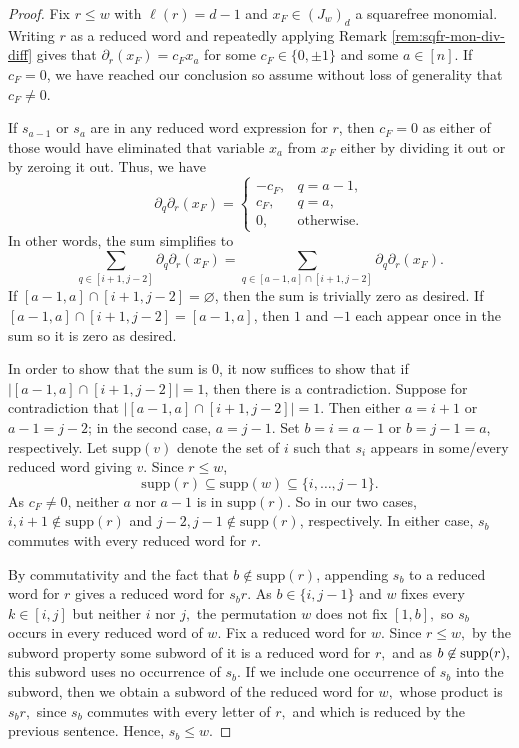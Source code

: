 \begin{proof}
    
    Fix $r\leq w$ with $\ell(r) = d-1$ and $x_F \in (J_w)_d$ a squarefree monomial.
    Writing $r$ as a reduced word and repeatedly applying Remark \ref{rem:sqfr-mon-div-diff} gives that $\partial_r(x_F) = c_F x_a$ for some $c_F\in \{0,\pm 1\}$ and some $a\in [n]$.
    If $c_F = 0$, we have reached our conclusion so assume without loss of generality that $c_F \neq 0$.

    If $s_{a-1}$ or $s_{a}$ are in any reduced word expression for $r$, then  $c_F = 0$ as either of those would have eliminated that variable $x_a$ from $x_{F}$ either by dividing it out or by zeroing it out.
    Thus, we have 
    \begin{equation}
    \label{eq:two-terms}
     \partial_q\partial_r(x_F)  =
     \begin{cases}
     -c_F,&q=a-1,\\
     c_F,&q=a,\\
     0,&\text{otherwise}.
     \end{cases}
     \end{equation}
In other words, the sum simplifies to 
\[\displaystyle\sum_{q\in [i+1,j-2]}\partial_q\partial_r(x_F)=\displaystyle\sum_{q\in [a-1,a]\cap [i+1,j-2]}\partial_q\partial_r(x_F).\]
If $[a-1,a]\cap [i+1,j-2] = \varnothing$, then the sum is trivially zero as desired.
If $[a-1,a]\cap [i+1,j-2] = [a-1,a]$, then $1$ and $-1$ each appear once in the sum so it is zero as desired.

In order to show that the sum is $0$, it now suffices to show that if $|[a-1,a]\cap [i+1,j-2]| = 1$, then there is a contradiction.
Suppose for contradiction that $|[a-1,a]\cap [i+1,j-2]| = 1$.
Then either $a=i+1$ or $a-1 = j-2$; in the second case, $a=j-1$.
Set $b = i = a-1$ or $b =j-1=a$, respectively.
Let $ \mathrm{supp}(v)$ denote the set of $i$ such that $s_i$ appears in some/every reduced word giving $v$.
Since \(r\leq w\),
\[\mathrm{supp}(r)\subseteq \mathrm{supp}(w)\subseteq\{i,\ldots,j-1\}. \]
As $c_F\neq 0$, neither $a$ nor $a-1$ is in $\mathrm{supp}(r)$.
So in our two cases, $i,i+1\not\in \mathrm{supp}(r)$ and $j-2,j-1\not\in \mathrm{supp}(r)$, respectively.
In either case, $s_b$ commutes with every reduced word for $r$.

By commutativity and the fact that $b\not\in\mathrm{supp}(r)$, appending $s_b$ to a reduced word for $r$ gives a reduced word for $s_br$.
As $b\in\{i,j-1\}$ and $w$ fixes every $k\in[i,j]$ but neither $i$ nor $j,$ the permutation $w$ does not fix $[1,b],$ so $s_b$ occurs in every reduced word of $w.$ Fix a reduced word for $w.$ Since $r\leq w,$ by the subword property \cite[Corollary 2.2.3]{BjornerBrenti} some subword of it is a reduced word for $r,$ and as $b\not\in\mathrm{supp}(r),$ this subword uses no occurrence of $s_b.$ If we include one occurrence of $s_b$ into the subword, then we obtain a subword of the reduced word for $w,$ whose product is $s_br,$ since $s_b$ commutes with every letter of $r,$ and which is reduced by the previous sentence. Hence, $s_b\leq w.$



\end{proof}

